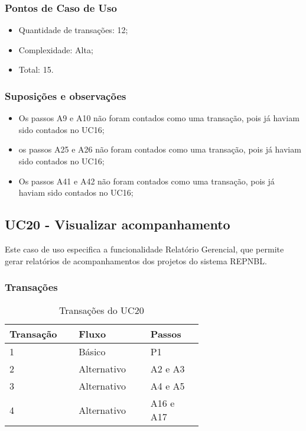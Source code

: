   \subsubsection{Pontos de Caso de Uso}

  \begin{itemize}
  \item Quantidade de transações: 12;
  \item Complexidade: Alta;
  \item Total: 15.
  \end{itemize}
  
  \subsubsection{Suposições e observações}
  
  \begin{itemize}
   \item Os passos A9 e A10 não foram contados como uma transação, pois já haviam sido contados no UC16;	
   \item os passos A25 e A26 não foram contados como uma transação, pois já haviam sido contados no UC16;	
   \item Os passos A41 e A42 não foram contados como uma transação, pois já haviam sido contados no UC16;
  \end{itemize}
  
  \vfill
  
  
  
\pagebreak
\subsection{UC20 - Visualizar acompanhamento}
  
  Este caso de uso especifica a funcionalidade Relatório Gerencial, que permite gerar 
  relatórios de acompanhamentos dos projetos do sistema REPNBL.
  
  \subsubsection{Transações}

  \begin{table*}[!h]
  \centering
  \caption{Transações do UC20}
  \label{uc20_transactions}
    \begin{tabular}{|p{0.20\linewidth}|p{0.25\linewidth}|p{0.20\linewidth}|}
    \hline
    \textbf{Transação} & \textbf{Fluxo} & \textbf{Passos} \\ 
    \hline
    1 & Básico & P1\\
    \hline
    2 & Alternativo & A2 e A3 \\
    \hline
    3 & Alternativo & A4 e A5 \\
    \hline
    4 & Alternativo & A16 e A17\\
    \hline
    \end{tabular}
  \end{table*}

